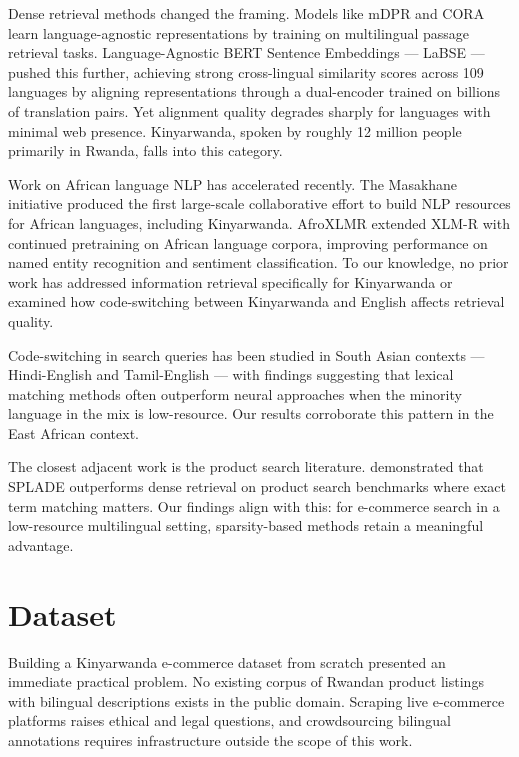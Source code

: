 \documentclass[11pt,a4paper]{article}
\begin{document}
Dense retrieval methods changed the framing. Models like mDPR
\citep{zhang2021} and CORA \citep{asai2021} learn language-agnostic
representations by training on multilingual passage retrieval tasks.
Language-Agnostic BERT Sentence Embeddings — LaBSE \citep{feng2022} —
pushed this further, achieving strong cross-lingual similarity scores
across 109 languages by aligning representations through a dual-encoder
trained on billions of translation pairs. Yet alignment quality degrades
sharply for languages with minimal web presence. Kinyarwanda, spoken by
roughly 12 million people primarily in Rwanda, falls into this category.

Work on African language NLP has accelerated recently. The Masakhane
initiative \citep{nekoto2020} produced the first large-scale collaborative
effort to build NLP resources for African languages, including Kinyarwanda.
AfroXLMR \citep{alabi2022} extended XLM-R with continued pretraining on
African language corpora, improving performance on named entity recognition
and sentiment classification. To our knowledge, no prior work has addressed
information retrieval specifically for Kinyarwanda or examined how
code-switching between Kinyarwanda and English affects retrieval quality.

Code-switching in search queries has been studied in South Asian contexts
— Hindi-English \citep{gupta2021} and Tamil-English \citep{jose2020} —
with findings suggesting that lexical matching methods often outperform
neural approaches when the minority language in the mix is low-resource.
Our results corroborate this pattern in the East African context.

The closest adjacent work is the product search literature. \citet{formal2021}
demonstrated that SPLADE outperforms dense retrieval on product search
benchmarks where exact term matching matters. Our findings align with this:
for e-commerce search in a low-resource multilingual setting,
sparsity-based methods retain a meaningful advantage.

\section{Dataset}
\label{sec:dataset}

Building a Kinyarwanda e-commerce dataset from scratch presented an
immediate practical problem. No existing corpus of Rwandan product listings
with bilingual descriptions exists in the public domain. Scraping live
e-commerce platforms raises ethical and legal questions, and crowdsourcing
bilingual annotations requires infrastructure outside the scope of this
work.
\end{document}
